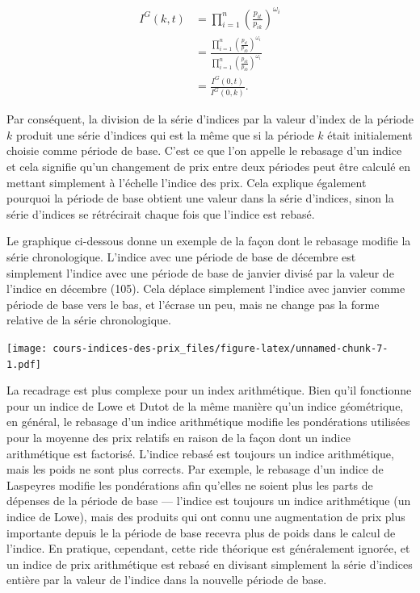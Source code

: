 \documentclass[
]{article}
\begin{document}
\begin{align*}
I^{G}(k, t) & = \prod_{i = 1}^{n} \left (\frac{p_{it}}{p_{ik}} \right)^{\omega_{i} } \\
& = \frac{\prod_{i = 1}^{n} \left (\frac{p_{it}}{p_{i0}} \right)^{\omega_{i}}}{\prod_{i = 1}^{n} \left (\frac{p_{ik}}{p_{i0}} \right)^{\omega_{i}}} \\
& = \frac{I^{G}(0, t)}{I^{G}(0, k)}.
\end{align*}

Par conséquent, la division de la série d'indices par la valeur d'index de la période \(k\) produit une série d'indices qui est la même que si la période \(k\) était initialement choisie comme période de base. C'est ce que l'on appelle le rebasage d'un indice et cela signifie qu'un changement de prix entre deux périodes peut être calculé en mettant simplement à l'échelle l'indice des prix. Cela explique également pourquoi la période de base obtient une valeur dans la série d'indices, sinon la série d'indices se rétrécirait chaque fois que l'indice est rebasé.

Le graphique ci-dessous donne un exemple de la façon dont le rebasage modifie la série chronologique. L'indice avec une période de base de décembre est simplement l'indice avec une période de base de janvier divisé par la valeur de l'indice en décembre (105). Cela déplace simplement l'indice avec janvier comme période de base vers le bas, et l'écrase un peu, mais ne change pas la forme relative de la série chronologique.

\texttt{[image: cours-indices-des-prix\_files/figure-latex/unnamed-chunk-7-1.pdf]}

La recadrage est plus complexe pour un index arithmétique. Bien qu'il fonctionne pour un indice de Lowe et Dutot de la même manière qu'un indice géométrique, en général, le rebasage d'un indice arithmétique modifie les pondérations utilisées pour la moyenne des prix relatifs en raison de la façon dont un indice arithmétique est factorisé. L'indice rebasé est toujours un indice arithmétique, mais les poids ne sont plus corrects. Par exemple, le rebasage d'un indice de Laspeyres modifie les pondérations afin qu'elles ne soient plus les parts de dépenses de la période de base --- l'indice est toujours un indice arithmétique (un indice de Lowe), mais des produits qui ont connu une augmentation de prix plus importante depuis le la période de base recevra plus de poids dans le calcul de l'indice. En pratique, cependant, cette ride théorique est généralement ignorée, et un indice de prix arithmétique est rebasé en divisant simplement la série d'indices entière par la valeur de l'indice dans la nouvelle période de base.
\end{document}
